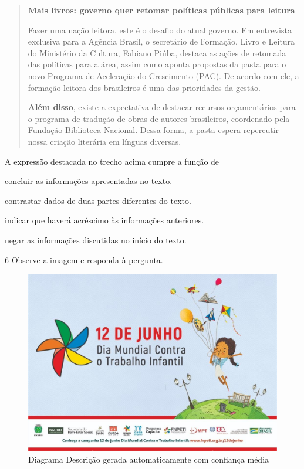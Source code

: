 \begin{quote}
\textbf{Mais livros: governo quer retomar políticas públicas para leitura}

Fazer uma nação leitora, este é o desafio do atual governo. Em
entrevista exclusiva para a Agência Brasil, o secretário de Formação,
Livro e Leitura do Ministério da Cultura, Fabiano Piúba, destaca as
ações de retomada das políticas para a área, assim como aponta propostas
da pasta para o novo Programa de Aceleração do Crescimento (PAC). De
acordo com ele, a formação leitora dos brasileiros é uma das prioridades
da gestão.

\textbf{Além disso}, existe a expectativa de destacar recursos orçamentários
para o programa de tradução de obras de autores brasileiros, coordenado
pela Fundação Biblioteca Nacional. Dessa forma, a pasta espera
repercutir nossa criação literária em línguas diversas.

\end{quote}

A expressão destacada no trecho acima cumpre a função de

\begin{escolha}
  \item concluir as informações apresentadas no texto.

  \item contrastar dados de duas partes diferentes do texto.

  \item indicar que haverá acréscimo às informações anteriores.

  \item negar as informações discutidas no início do texto.
\end{escolha}



\num{6} Observe a imagem e responda à pergunta.

\begin{figure}
\centering
\includegraphics[width=\textwidth]{./imgQ4PORT/media/image6.jpeg}
\caption{Diagrama Descrição gerada automaticamente com confiança média}
\end{figure}

